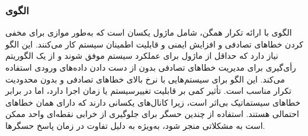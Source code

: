 \subsubsection{الگوی }
\label{ArmoushHWMOutNSec}
\begin{RTL}
الگوی  با ارائه تکرار همگن، شامل  ماژول یکسان است
که به‌طور موازی برای مخفی کردن خطاهای تصادفی و افزایش ایمنی
و قابلیت اطمینان سیستم کار می‌کنند. این الگو نیاز دارد که
حداقل  از  ماژول برای عملکرد سیستم موفق شوند و
از یک الگوریتم رأی‌گیری برای مدیریت خطاهای تصادفی بدون از دست دادن
داده‌های ورودی استفاده می‌کند. این الگو برای سیستم‌هایی با نرخ بالای خطاهای
تصادفی و بدون محدودیت تکرار مناسب است. تأثیر کمی بر قابلیت تغییرسیستم
یا زمان اجرا دارد، اما در برابر خطاهای سیستماتیک بی‌اثر است،
زیرا کانال‌های یکسانی دارند که دارای همان خطاهای
احتمالی هستند. استفاده از چندین حسگر برای جلوگیری از
خرابی نقطه‌ای واحد ممکن است به مشکلاتی منجر شود،
به‌ویژه به دلیل تفاوت در زمان پاسخ حسگرها.
\end{RTL}